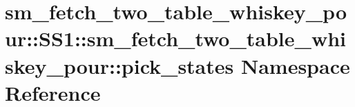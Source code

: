 \hypertarget{namespacesm__fetch__two__table__whiskey__pour_1_1SS1_1_1sm__fetch__two__table__whiskey__pour_1_1pick__states}{}\section{sm\+\_\+fetch\+\_\+two\+\_\+table\+\_\+whiskey\+\_\+pour\+:\+:S\+S1\+:\+:sm\+\_\+fetch\+\_\+two\+\_\+table\+\_\+whiskey\+\_\+pour\+:\+:pick\+\_\+states Namespace Reference}
\label{namespacesm__fetch__two__table__whiskey__pour_1_1SS1_1_1sm__fetch__two__table__whiskey__pour_1_1pick__states}
